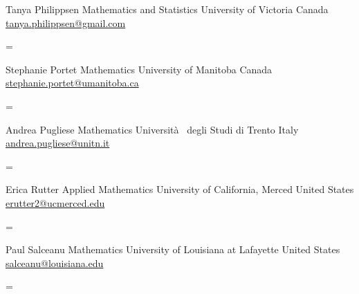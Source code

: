 \documentclass[
  letterpaper,
  DIV=11,
  numbers=noendperiod]{scrartcl}
\newenvironment{absolutelynopagebreak}
  {\par\nobreak\vfil\penalty0\vfilneg
   \vtop\bgroup}
  {\par\xdef\tpd{\the\prevdepth}\egroup
   \prevdepth=\tpd}
\begin{document}
\begin{absolutelynopagebreak}Tanya   Philippsen \newline
\mbox{}\quad  Mathematics and Statistics \newline
\mbox{}\quad  University of Victoria \newline
\mbox{}\quad  Canada \newline
\mbox{}\quad \href{mailto: tanya.philippsen@gmail.com }{ tanya.philippsen@gmail.com }
\end{absolutelynopagebreak}\vskip0.2cm
\begin{absolutelynopagebreak}Stephanie   Portet \newline
\mbox{}\quad  Mathematics \newline
\mbox{}\quad  University of Manitoba \newline
\mbox{}\quad  Canada \newline
\mbox{}\quad \href{mailto: stephanie.portet@umanitoba.ca }{ stephanie.portet@umanitoba.ca }
\end{absolutelynopagebreak}\vskip0.2cm
\begin{absolutelynopagebreak}Andrea   Pugliese \newline
\mbox{}\quad  Mathematics \newline
\mbox{}\quad  Università  degli Studi di Trento \newline
\mbox{}\quad  Italy \newline
\mbox{}\quad \href{mailto: andrea.pugliese@unitn.it }{ andrea.pugliese@unitn.it }
\end{absolutelynopagebreak}\vskip0.2cm
\begin{absolutelynopagebreak}Erica   Rutter \newline
\mbox{}\quad  Applied Mathematics \newline
\mbox{}\quad  University of California, Merced \newline
\mbox{}\quad  United States \newline
\mbox{}\quad \href{mailto: erutter2@ucmerced.edu }{ erutter2@ucmerced.edu }
\end{absolutelynopagebreak}\vskip0.2cm
\begin{absolutelynopagebreak}Paul   Salceanu \newline
\mbox{}\quad  Mathematics \newline
\mbox{}\quad  University of Louisiana at Lafayette \newline
\mbox{}\quad  United States \newline
\mbox{}\quad \href{mailto: salceanu@louisiana.edu }{ salceanu@louisiana.edu }
\end{absolutelynopagebreak}\vskip0.2cm
\end{document}
